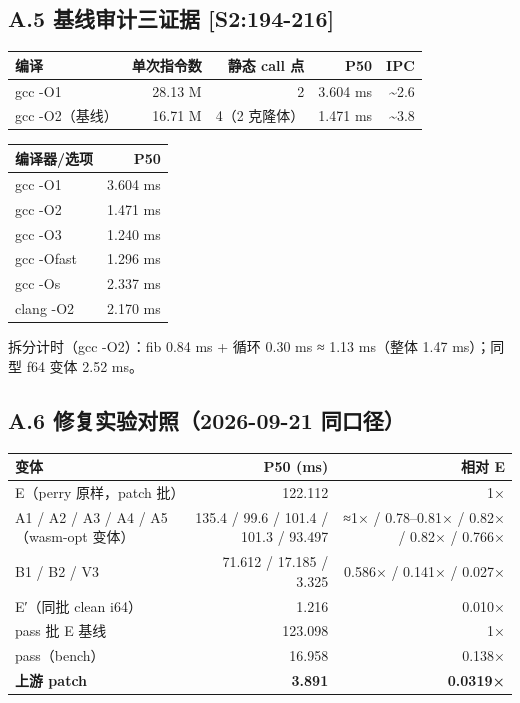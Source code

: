\documentclass[11pt, a4paper]{article}
\begin{document}
\subsection{A.5 基线审计三证据 [S2:194-216]}

\begin{center}\small\begin{tabular}{lrrrr}
\toprule
编译 & 单次指令数 & 静态 call 点 & P50 & IPC \\
\midrule
gcc -O1 & 28.13 M & 2 & 3.604 ms & \textasciitilde{}2.6 \\
gcc -O2（基线） & 16.71 M & 4（2 克隆体） & 1.471 ms & \textasciitilde{}3.8 \\
\bottomrule
\end{tabular}\end{center}


\begin{center}\small\begin{tabular}{lr}
\toprule
编译器/选项 & P50 \\
\midrule
gcc -O1 & 3.604 ms \\
gcc -O2 & 1.471 ms \\
gcc -O3 & 1.240 ms \\
gcc -Ofast & 1.296 ms \\
gcc -Os & 2.337 ms \\
clang -O2 & 2.170 ms \\
\bottomrule
\end{tabular}\end{center}


拆分计时（gcc -O2）：fib 0.84 ms + 循环 0.30 ms ≈ 1.13 ms（整体 1.47 ms）；同型 f64 变体 2.52 ms。


\subsection{A.6 修复实验对照（2026-09-21 同口径）}

\begin{center}\small\begin{tabular}{lrr}
\toprule
变体 & P50 (ms) & 相对 E \\
\midrule
E（perry 原样，patch 批） & 122.112 & 1× \\
A1 / A2 / A3 / A4 / A5（wasm-opt 变体） & 135.4 / 99.6 / 101.4 / 101.3 / 93.497 & ≈1× / 0.78–0.81× / 0.82× / 0.82× / 0.766× \\
B1 / B2 / V3 & 71.612 / 17.185 / 3.325 & 0.586× / 0.141× / 0.027× \\
E′（同批 clean i64） & 1.216 & 0.010× \\
pass 批 E 基线 & 123.098 & 1× \\
pass（bench） & 16.958 & 0.138× \\
\textbf{上游 patch} & \textbf{3.891} & \textbf{0.0319×} \\
\bottomrule
\end{tabular}\end{center}
\end{document}
